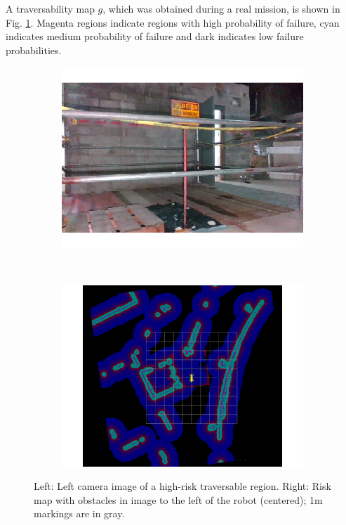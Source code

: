 \documentclass[letterpaper, 10pt, conference]{ieeeconf}      %
\newcommand{\rev}[1]{{\color{blue} #1 }} %
\begin{document}

A traversability map $g$, which was obtained during a real mission, is shown in Fig. \ref{global_costmap}. %
\rev{Magenta regions indicate regions with high probability of failure, cyan indicates medium probability of failure and dark indicates low failure probabilities.}

\begin{figure}[thpb]
   \centering
    \begin{subfigure}{0.49\linewidth}
        \centering
        \includegraphics[trim={1cm 1cm 0cm 1cm},clip, width=\linewidth]{graphics/costmap_image.png}
    \end{subfigure}%
    ~ 
    \begin{subfigure}{0.49\linewidth}
        \centering
        \includegraphics[trim={1cm 1cm 1cm 2cm},clip,width=\linewidth]{graphics/costmap_large.png}
    \end{subfigure}
    \caption{Left: Left camera image of a high-risk traversable region.  Right:  Risk map with obstacles in image to the left of the robot (centered); 1m markings are in gray.}
    \label{global_costmap}
\end{figure}
\end{document}
